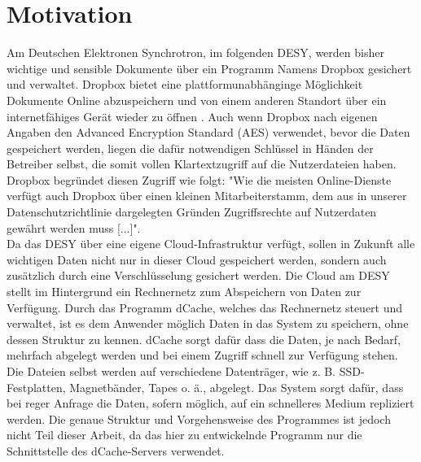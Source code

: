 \documentclass[10pt, a4paper,headsepline]{scrreprt}
\begin{document}
\section{Motivation}
Am Deutschen Elektronen Synchrotron, im folgenden DESY, werden bisher wichtige und sensible Dokumente über ein Programm Namens Dropbox gesichert und verwaltet. Dropbox bietet eine plattformunabhänginge Möglichkeit Dokumente Online abzuspeichern und von einem anderen Standort über ein internetfähiges Gerät wieder zu öffnen \cite{website:dropbox-main}. Auch wenn Dropbox nach eigenen Angaben den Advanced Encryption Standard (AES)  verwendet, bevor die Daten gespeichert werden, liegen die dafür notwendigen Schlüssel in Händen der Betreiber selbst, die somit vollen Klartextzugriff auf die Nutzerdateien haben. Dropbox begründet diesen Zugriff wie folgt:  "Wie die meisten Online-Dienste verfügt auch Dropbox über einen kleinen Mitarbeiterstamm, dem aus in unserer Datenschutzrichtlinie dargelegten Gründen Zugriffsrechte auf Nutzerdaten gewährt werden muss [...]". \cite{website:dropbox-help} \\
Da das DESY über eine eigene Cloud-Infrastruktur verfügt, sollen in Zukunft alle wichtigen Daten nicht nur in dieser Cloud gespeichert werden, sondern auch zusätzlich durch eine Verschlüsselung gesichert werden. Die Cloud am DESY stellt im Hintergrund ein Rechnernetz zum Abspeichern von Daten zur Verfügung. Durch das Programm dCache, welches das Rechnernetz steuert und verwaltet, ist es dem Anwender möglich Daten in das System zu speichern, ohne dessen Struktur zu kennen. dCache sorgt dafür dass die Daten, je nach Bedarf, mehrfach abgelegt werden und bei einem Zugriff schnell zur Verfügung stehen. Die Dateien selbst werden auf verschiedene Datenträger, wie z. B. SSD-Festplatten, Magnetbänder, Tapes o. ä., abgelegt. Das System sorgt dafür, dass bei reger Anfrage die Daten, sofern möglich, auf ein schnelleres Medium repliziert werden. Die genaue Struktur und Vorgehensweise des Programmes ist jedoch nicht Teil dieser Arbeit, da das hier zu entwickelnde Programm nur die Schnittstelle des dCache-Servers verwendet.
\end{document}
